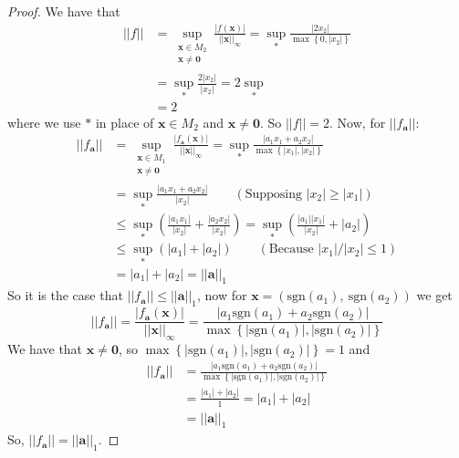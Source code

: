 \documentclass{article}
\newcommand{\norm}[1]{\left|\left|#1\right|\right|}
\newcommand{\abs}[1]{\left|#1\right|}
\newcommand{\parens}[1]{\left(#1\right)}
\newcommand{\bracks}[1]{\left\{#1\right\}}
\begin{document}
        \begin{proof}
        We have that 
        \begin{align*}
        \norm{f} &= \sup_{\substack{\bm{x}\in M_2\\ \bm{x} \neq \bm{0}}}
        \frac{\abs{f(\bm{x})}}{\norm{\bm{x}}_\infty} = \sup_{*}
        \frac{\abs{2x_2}}{\max\bracks{0, \abs{x_2}}} \\
        &= \sup_{*}\frac{2\abs{x_2}}{\abs{x_2}} = 2\sup_{*} \\
        &= 2
        \end{align*}
        where we use $*$ in place of $\bm{x} \in M_2$ and $\bm{x}\neq\bm{0}$. So 
        $\norm{f} = 2$. Now, for $\norm{f_{\bm{a}}}$:
        \begin{align*}
        \norm{f_{\bm{a}}} &= \sup_{\substack{\bm{x}\in M_1 \\ \bm{x} \neq \bm{0}}}
        \frac{\abs{f_{\bm{a}}(\bm{x})}}{\norm{\bm{x}}_\infty} = \sup_{*}
        \frac{\abs{a_1x_1 + a_2x_2}}{\max\bracks{\abs{x_1},\abs{x_2}}} \\
        &= \sup_{*}\frac{\abs{a_1x_1 + a_2x_2}}{\abs{x_2}} \qquad 
        \parens{\text{Supposing }\abs{x_2} \geq \abs{x_1}} \\
        &\leq \sup_{*}\parens{\frac{\abs{a_1x_1}}{\abs{x_2}} + 
        \frac{\abs{a_2x_2}}{\abs{x_2}}} = \sup_{*}
        \parens{\frac{\abs{a_1}\abs{x_1}}{\abs{x_2}} + \abs{a_2}} \\
        &\leq \sup_{*}\parens{\abs{a_1} + \abs{a_2}} \qquad 
        \parens{\text{Because }\abs{x_1}/\abs{x_2} \leq 1} \\
        &= \abs{a_1} + \abs{a_2} = \norm{\bm{a}}_1
        \end{align*}
        So it is the case that $\norm{f_{\bm{a}}} \leq \norm{\bm{a}}_1$, now for 
        $\bm{x} = \parens{\text{sgn}(a_1),\ \text{sgn}(a_2)}$ we get 
        $$\norm{f_{\bm{a}}} = \frac{\abs{f_{\bm{a}}(\bm{x})}}{\norm{\bm{x}}_\infty} 
        = \frac{\abs{a_1\text{sgn}(a_1) + a_2\text{sgn}(a_2)}}
        {\max\bracks{\abs{\text{sgn}(a_1)}, \abs{\text{sgn}(a_2)}}}$$
        We have that $\bm{x} \neq \bm{0}$, so 
        $\max\bracks{\abs{\text{sgn}(a_1)}, \abs{\text{sgn}(a_2)}} = 1$ and
        \begin{align*}
        \norm{f_{\bm{a}}} &= \frac{\abs{a_1\text{sgn}(a_1) + 
        a_2\text{sgn}(a_2)}}{\max\bracks{\abs{\text{sgn}(a_1)}, 
        \abs{\text{sgn}(a_2)}}} \\
        &= \frac{\abs{a_1} + \abs{a_2}}{1} = \abs{a_1} + \abs{a_2} \\
        &= \norm{\bm{a}}_1
        \end{align*}
        So, $\norm{f_{\bm{a}}} = \norm{\bm{a}}_1$.
        \end{proof}
\end{document}
